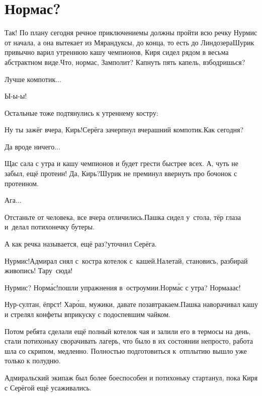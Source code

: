 \chapter{Нормас?}
\vepsianrose

\diagdash Так! По плану сегодня речное приключение\mdash мы должны пройти всю речку Нурмис от начала, а она вытекает из Мярандуксы, до конца, то есть до Линдозера\mdash Шурик привычно варил утреннюю кашу чемпионов, Киря сидел рядом в весьма абстрактном виде.\mdash Что, нормас, Замполит? Капнуть пять капель, взбодришься?

\diagdash Лучше компотик$\ldots$

\diagdash Ы-ы-ы!%

Остальные тоже подтянулись к утреннему костру:

\diagdash Ну ты зажёг вчера, Кирь!\mdash Серёга зачерпнул вчерашний компотик.\mdash Как сегодня?

\diagdash Да вроде ничего$\ldots$

\diagdash Щас сала с утра и кашу чемпионов и будет грести быстрее всех. А, чуть не забыл, ещё протеин! Да, Кирь?\mdash Шурик не преминул ввернуть про бочонок с протеином.

\diagdash Ага$\ldots$

\diagdash Отстаньте от человека, все вчера отличились.\mdash Пашка сидел у~стола, тёр глаза и~делал потихонечку бутеры.

\diagdash А как речка называется, ещё раз?\mdash уточнил Серёга.

\diagdash Нурмис!\mdash Адмирал снял с~костра котелок с~кашей.\mdash Налетай, становись, разбирай живопись! Тару~сюда!

\diagdash Нурмис? Норм{\'а}с!\mdash пошли упражнения в~остроумии.\mdash Норм{\'а}с с утра?  Норма\sdash а\sdash ас!

\diagdash Нур-султан, ёпрст! Хар{\'о}ш, мужики, давате позавтракаем.\mdash Пашка наворачивал кашу и стрелял конфеты вприкуску с подоспевшим чайком.

Потом ребята сделали ещё полный котелок чая и залили его в термосы на день, стали потихоньку сворачивать лагерь, что было в их состоянии непросто, работа шла со скрипом, медленно. Полностью подготовиться к~отплытию вышло уже только к полудню.

Адмиральский экипаж был более боеспособен и потихоньку стартанул, пока Киря с Серёгой ещё усаживались. 


